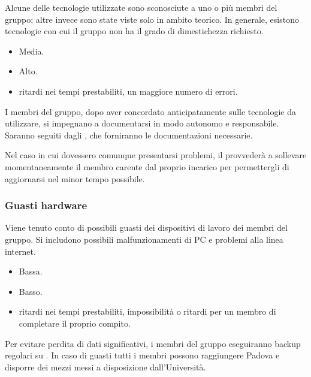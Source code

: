 \documentclass[a4paper, titlepage]{article}
\begin{document}
	Alcune delle tecnologie utilizzate sono sconosciute a uno o più membri del gruppo; altre invece sono state viste solo in ambito teorico. In generale, esistono tecnologie con cui il gruppo non ha il grado di dimestichezza richiesto.
	
	\begin{itemize}
		\item {} Media.
		\item {} Alto.
		\item {} ritardi nei tempi prestabiliti, un maggiore numero di errori.
	\end{itemize}
	
	I membri del gruppo, dopo aver concordato anticipatamente sulle tecnologie da utilizzare, si impegnano a documentarsi in modo autonomo e responsabile. Saranno seguiti dagli , che forniranno le documentazioni necessarie.
	
	 Nel caso in cui dovessero comunque presentarsi problemi, il  provvederà a sollevare momentaneamente il membro carente dal proprio incarico per permettergli di aggiornarsi nel minor tempo possibile. 
	
	
	\subsubsection{Guasti hardware}
	Viene tenuto conto di possibili guasti dei dispositivi di lavoro dei membri del gruppo. Si includono possibili malfunzionamenti di PC e problemi alla linea internet.
	
	\begin{itemize}
		\item {} Bassa.
		\item {} Basso.
		\item {} ritardi nei tempi prestabiliti, impossibilità o ritardi per un membro di completare il proprio compito.
	\end{itemize}
	
	Per evitare perdita di dati significativi, i membri del gruppo eseguiranno backup regolari su . In caso di guasti tutti i membri possono raggiungere Padova e disporre dei mezzi messi a disposizione dall'Università.
	
\end{document}
